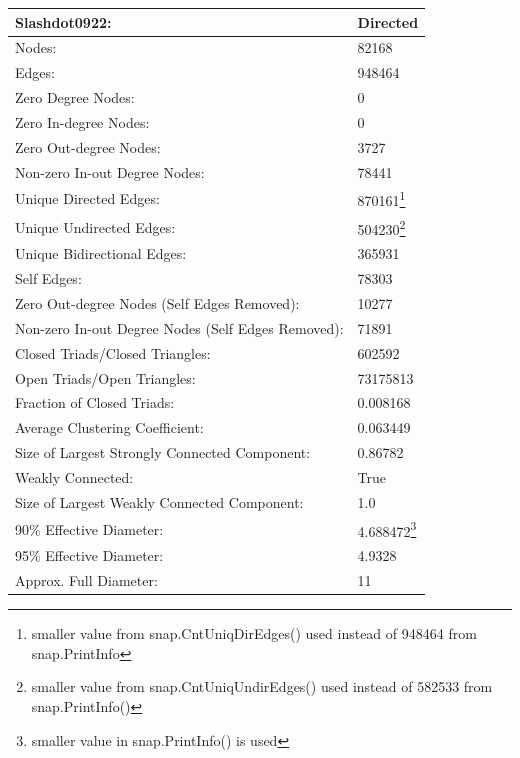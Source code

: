 \documentclass{subfiles}
\begin{document}
  \begin{tabular}{|l|l|}
    \hline
    Slashdot0922: & Directed\\
    \hline
    Nodes: & 82168\\
    \hline
    Edges: & 948464\\
    \hline
    Zero Degree Nodes: & 0\\
    \hline
    Zero In-degree Nodes: & 0\\
    \hline
    Zero Out-degree Nodes: & 3727\\
    \hline
    Non-zero In-out Degree Nodes: & 78441\\
    \hline
    Unique Directed Edges: & 870161\footnote{smaller value from snap.CntUniqDirEdges() used instead of 948464 from snap.PrintInfo}\\
    \hline
    Unique Undirected Edges: & 504230\footnote{smaller value from snap.CntUniqUndirEdges() used instead of 582533 from snap.PrintInfo()}\\
    \hline
    Unique Bidirectional Edges: & 365931\\
    \hline
    Self Edges: & 78303\\
    \hline
    Zero Out-degree Nodes (Self Edges Removed): & 10277\\
    \hline
    Non-zero In-out Degree Nodes (Self Edges Removed): & 71891\\
    \hline
    Closed Triads/Closed Triangles: & 602592\\
    \hline
    Open Triads/Open Triangles: & 73175813\\
    \hline
    Fraction of Closed Triads: & 0.008168\\
    \hline
    Average Clustering Coefficient: & 0.063449\\
    \hline
    Size of Largest Strongly Connected Component: & 0.86782\\
    \hline
    Weakly Connected: & True\\
    \hline
    Size of Largest Weakly Connected Component: & 1.0\\
    \hline
    90\% Effective Diameter: & 4.688472\footnote{smaller value in snap.PrintInfo() is used}\\
    \hline
    95\% Effective Diameter: & 4.9328\\
    \hline
    Approx. Full Diameter: & 11\\
    \hline
  \end{tabular}
\end{document}
